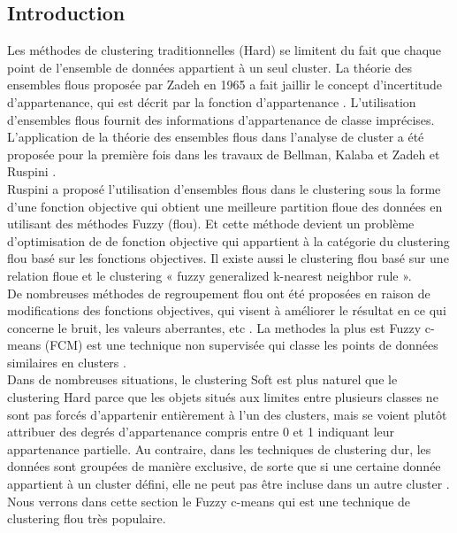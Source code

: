 \subsection{Introduction}
Les méthodes de clustering traditionnelles (Hard) se limitent du fait que chaque point de l'ensemble de données appartient à un seul cluster. La théorie des ensembles flous proposée par Zadeh \cite{zadeh1965information} en 1965 a fait jaillir le concept d'incertitude d'appartenance, qui est décrit par la fonction d'appartenance \cite{yang1993survey}. L'utilisation d'ensembles flous fournit des informations d'appartenance de classe imprécises. L'application de la théorie des ensembles flous dans l'analyse de cluster a été proposée pour la première fois dans les travaux de Bellman, Kalaba et Zadeh \cite{zadeh1965information} et Ruspini \cite{ruspini1969new}. \\
Ruspini a proposé l'utilisation d'ensembles flous dans le clustering sous la forme d'une fonction objective qui obtient une meilleure partition floue des données en utilisant des méthodes Fuzzy (flou). Et cette méthode devient un problème d’optimisation de de fonction objective qui appartient à la catégorie du clustering flou basé sur les fonctions objectives. Il existe aussi le clustering flou basé sur une relation floue et le clustering « fuzzy generalized k-nearest neighbor rule ».\\
De nombreuses méthodes de regroupement flou ont été proposées en raison de modifications des fonctions objectives, qui visent à améliorer le résultat en ce qui concerne le bruit, les valeurs aberrantes, etc \cite{zhou2016method}. La methodes la plus est Fuzzy c-means (FCM) est une technique non supervisée qui classe les points de données similaires en clusters \cite{gurrutxaga2010sep}.\\
Dans de nombreuses situations, le clustering Soft est plus naturel que le clustering Hard parce que les objets situés aux limites entre plusieurs classes ne sont pas forcés d'appartenir entièrement à l'un des clusters, mais se voient plutôt attribuer des degrés d'appartenance compris entre 0 et 1 indiquant leur appartenance partielle. Au contraire, dans les techniques de clustering dur, les données sont groupées de manière exclusive, de sorte que si une certaine donnée appartient à un cluster défini, elle ne peut pas être incluse dans un autre cluster \cite{bora2014comparative}. Nous verrons dans cette section le Fuzzy c-means qui est une technique de clustering flou très populaire.\\

